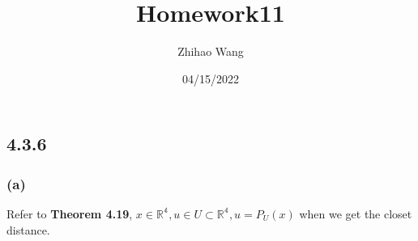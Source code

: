\documentclass{article}
\title{Homework11}
\author{Zhihao Wang}
\date{04/15/2022}
\begin{document}
\maketitle 

\subsection*{4.3.6}
\subsubsection*{(a)}
Refer to \textbf{Theorem 4.19}, $x \in \mathbb{R^4}, u \in U \subset \mathbb{R^4}, u = P_U(x)$ when we get the closet distance.
\begin{equation*}
    \begin{split}
       

    \end{split}
\end{equation*}
\end{document}
